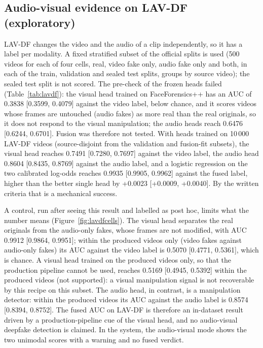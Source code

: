 \documentclass[conference,a4paper]{IEEEtran_nodash}
\begin{document}
\subsection{Audio-visual evidence on LAV-DF (exploratory)}
LAV-DF changes the video and the audio of a clip independently, so it has a
label per modality. A fixed stratified subset of the official splits is used
(500 videos for each of four cells, real, video fake only, audio fake only and
both, in each of the train, validation and sealed test splits, groups by source
video); the sealed test split is not scored. The pre-check of the frozen heads
failed (Table~\ref{tab:lavdf}): the visual head trained on FaceForensics++ has an
AUC of 0.3838 [0.3599, 0.4079] against the video label, below chance, and it
scores videos whose frames are untouched (audio fakes) as more real than the
real originals, so it does not respond to the visual manipulation; the audio
heads reach 0.6476 [0.6244, 0.6701]. Fusion was therefore not tested. With
heads trained on 10\,000 LAV-DF videos (source-disjoint from the validation and
fusion-fit subsets), the visual head reaches 0.7491 [0.7280, 0.7697] against the
video label, the audio head 0.8604 [0.8435, 0.8769] against the audio label, and
a logistic regression on the two calibrated log-odds reaches 0.9935
[0.9905, 0.9962] against the fused label, higher than the better single head by
+0.0023 [+0.0009, +0.0040]. By the written criteria that is a mechanical
success.

A control, run after seeing this result and labelled as post hoc, limits what the
number means (Figure~\ref{fig:lavdfcells}). The visual head separates the real
originals from the audio-only fakes, whose frames are not modified, with AUC
0.9912 [0.9864, 0.9951]; within the produced videos only (video fakes against
audio-only fakes) its AUC against the video label is 0.5070 [0.4771, 0.5361],
which is chance. A visual head trained on the produced videos only, so that the
production pipeline cannot be used, reaches 0.5169 [0.4945, 0.5392] within the
produced videos (not supported): a visual manipulation signal is not recoverable
by this recipe on this subset. The audio head, in contrast, is a manipulation
detector: within the produced videos its AUC against the audio label is 0.8574
[0.8394, 0.8752]. The fused AUC on LAV-DF is therefore an in-dataset result
driven by a production-pipeline cue of the visual head, and no audio-visual
deepfake detection is claimed. In the system, the audio-visual mode shows the
two unimodal scores with a warning and no fused verdict.
\end{document}
